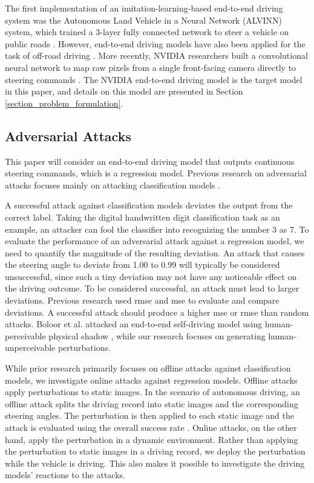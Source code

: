 The first implementation of an imitation-learning-based end-to-end driving system was the Autonomous Land Vehicle in a Neural Network (ALVINN) system, which trained a 3-layer fully connected network to steer a vehicle on public roads \citep{NIPS1988_812b4ba2}. However, end-to-end driving models have also been applied for the task of off-road driving \citep{NIPS2005_fdf1bc56}. More recently, NVIDIA researchers built a convolutional neural network to map raw pixels from a single front-facing camera directly to steering commands \citep{bojarski2016end}. The NVIDIA end-to-end driving model is the target model in this paper, and details on this model are presented in Section \ref{section_problem_formulation}.

\subsection{Adversarial Attacks}
\label{adversarial_attacks}

This paper will consider an end-to-end driving model that outputs continuous steering commands, which is a regression model. Previous research on adversarial attacks focuses mainly on attacking classification models \citep{li2022review} \citep{zhang2021evaluating}\citep{boloor2019simple}\citep{abideen2022a3d}.

A successful attack against classification models deviates the output from the correct label. Taking the digital handwritten digit classification task as an example, an attacker can fool the classifier into recognizing the number 3 as 7. To evaluate the performance of an adversarial attack against a regression model, we need to quantify the magnitude of the resulting deviation. An attack that causes the steering angle to deviate from 1.00 to 0.99 will typically be considered unsuccessful, since such a tiny deviation may not have any noticeable effect on the driving outcome. To be considered successful, an attack must lead to larger deviations. Previous research used \acrfull{rmse} \citep{msml} and \acrfull{mse} \citep{nguyen2018adversarial} to evaluate and compare deviations. A successful attack should produce a higher \acrshort{mse} or \acrshort{rmse} than random attacks. Boloor et al. attacked an end-to-end self-driving model using human-perceivable physical shadow \citep{boloor2019}, while our research focuses on generating human-unperceivable perturbations.

While prior research primarily focuses on offline attacks against classification models, we investigate online attacks against regression models. Offline attacks apply perturbations to static images. In the scenario of autonomous driving, an offline attack splits the driving record into static images and the corresponding steering angles. The perturbation is then applied to each static image and the attack is evaluated using the overall success rate \citep{Deng2020}. Online attacks, on the other hand, apply the perturbation in a dynamic environment. Rather than applying the perturbation to static images in a driving record, we deploy the perturbation while the vehicle is driving. This also makes it possible to investigate the driving models' reactions to the attacks. 

